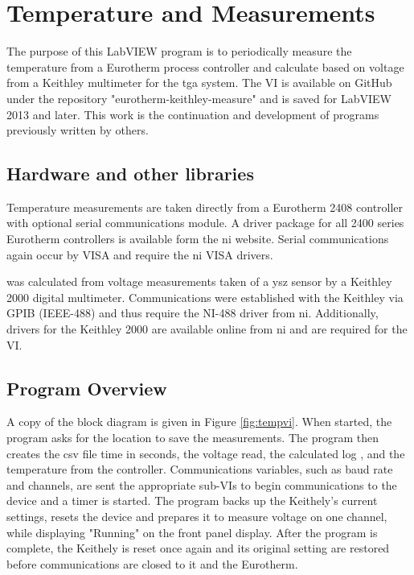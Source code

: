 \section{Temperature and  Measurements}
    \label{app:tgavi}
    The purpose of this LabVIEW program is to periodically measure the temperature from a Eurotherm process controller and calculate  based on voltage from a Keithley multimeter for the \gls{tga} system.
    The VI is available on GitHub under the repository "eurotherm-keithley-measure" and is saved for LabVIEW 2013 and later.
    This work is the continuation and development of programs previously written by others.

    \subsection{Hardware and other libraries}
    Temperature measurements are taken directly from a Eurotherm 2408 controller with optional serial communications module.
    A driver package for all 2400 series Eurotherm controllers is available form the \gls{ni} website.
    Serial communications again occur by VISA and require the \gls{ni} VISA drivers.

     was calculated from voltage measurements taken of a \gls{ysz} sensor by a Keithley 2000 digital multimeter.
    Communications were established with the Keithley via GPIB (IEEE-488) and thus require the NI-488 driver from \gls{ni}.
    Additionally, drivers for the Keithley 2000 are available online from \gls{ni} and are required for the VI.

    \subsection{Program Overview}
    A copy of the block diagram is given in Figure \ref{fig:tempvi}.
    When started, the program asks for the location to save the measurements.
    The program then creates the csv file time in seconds, the voltage read, the calculated log , and the temperature from the controller.
    Communications variables, such as baud rate and channels, are sent the appropriate sub-VIs to begin communications to the device and a timer is started.
    The program backs up the Keithely's current settings, resets the device and prepares it to measure voltage on one channel, while displaying "Running" on the front panel display.
    After the program is complete, the Keithely is reset once again and its original setting are restored before communications are closed to it and the Eurotherm.


